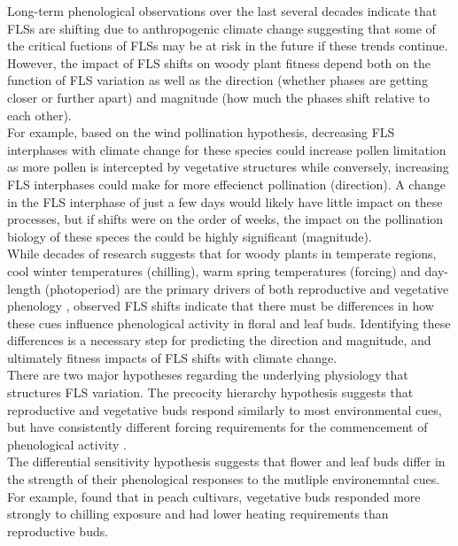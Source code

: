 \documentclass[11pt]{article}
\begin{document}
\noindent Long-term phenological observations over the last several decades indicate that FLSs are shifting due to anthropogenic climate change \citep{Buonaiuto2020} suggesting that some of the critical fuctions of FLSs may be at risk in the future if these trends continue. However, the impact of FLS shifts on woody plant fitness depend both on the function of FLS variation as well as the direction (whether phases are getting closer or further apart) and magnitude (how much the phases shift relative to each other).\\

For example, based on the wind pollination hypothesis, decreasing FLS interphases with climate change for these species could increase pollen limitation as more pollen is intercepted by vegetative structures while conversely, increasing FLS interphases could make for more effecienct pollination (direction). A change in the FLS interphase of just a few days would likely have little impact on these processes, but if shifts were on the order of weeks, the impact on the pollination biology of these speces the could be highly significant (magnitude).\\

\noindent While decades of research suggests that for woody plants in temperate regions, cool winter temperatures (chilling), warm spring temperatures (forcing) and day-length (photoperiod) are the primary drivers of both reproductive and vegetative phenology \citep{Forrest2018,Flynn2018}, observed FLS shifts indicate that there must be differences in how these cues influence phenological activity in floral and leaf buds. Identifying these differences is a necessary step for predicting the direction and magnitude, and ultimately fitness impacts of FLS shifts with climate change.\\

\noindent There are two major hypotheses regarding the underlying physiology that structures FLS variation.
The precocity hierarchy hypothesis suggests that reproductive and vegetative buds respond similarly to most environmental cues, but have consistently different forcing requirements for the commencement of phenological activity \citep{Guo_2014}.\\

 \noindent The differential sensitivity hypothesis suggests that flower and leaf buds differ in the strength of their phenological responses to the mutliple environemntal cues. For example, \citet{Garigalio2016} found that in peach cultivars, vegetative buds responded more strongly to chilling exposure and had lower heating requirements than reproductive buds. \\
\end{document}
